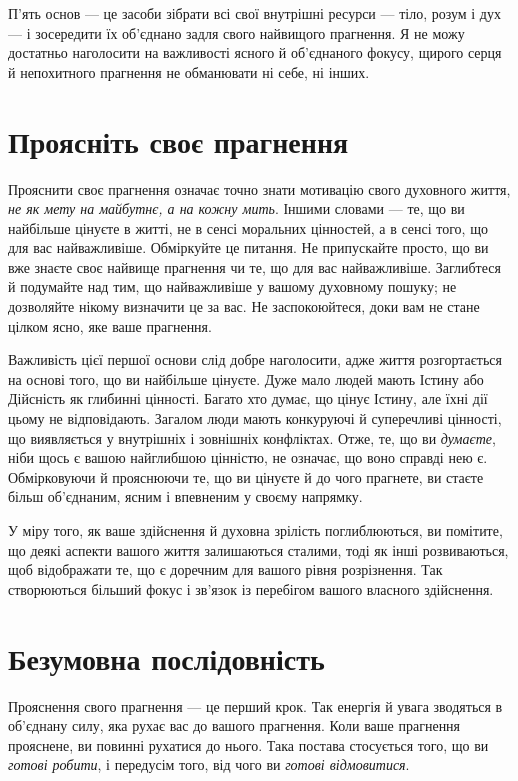 П'ять основ — це засоби зібрати всі свої внутрішні ресурси — тіло, розум і дух — і зосередити їх об'єднано задля свого найвищого прагнення. Я не можу достатньо наголосити на важливості ясного й об'єднаного фокусу, щирого серця й непохитного прагнення не обманювати ні себе, ні інших.

\section*{Проясніть своє прагнення}

Прояснити своє прагнення означає точно знати мотивацію свого духовного життя, \emph{не як мету на майбутнє, а на кожну мить}. Іншими словами — те, що ви найбільше цінуєте в житті, не в сенсі моральних цінностей, а в сенсі того, що для вас найважливіше. Обміркуйте це питання. Не припускайте просто, що ви вже знаєте своє найвище прагнення чи те, що для вас найважливіше. Заглибтеся й подумайте над тим, що найважливіше у вашому духовному пошуку; не дозволяйте нікому визначити це за вас. Не заспокоюйтеся, доки вам не стане цілком ясно, яке ваше прагнення.

Важливість цієї першої основи слід добре наголосити, адже життя розгортається на основі того, що ви найбільше цінуєте. Дуже мало людей мають Істину або Дійсність як глибинні цінності. Багато хто думає, що цінує Істину, але їхні дії цьому не відповідають. Загалом люди мають конкуруючі й суперечливі цінності, що виявляється у внутрішніх і зовнішніх конфліктах. Отже, те, що ви \emph{думаєте}, ніби щось є вашою найглибшою цінністю, не означає, що воно справді нею є. Обмірковуючи й прояснюючи те, що ви цінуєте й до чого прагнете, ви стаєте більш об'єднаним, ясним і впевненим у своєму напрямку.

У міру того, як ваше здійснення й духовна зрілість поглиблюються, ви помітите, що деякі аспекти вашого життя залишаються сталими, тоді як інші розвиваються, щоб відображати те, що є доречним для вашого рівня розрізнення. Так створюються більший фокус і зв'язок із перебігом вашого власного здійснення.

\section*{Безумовна послідовність}

Прояснення свого прагнення — це перший крок. Так енергія й увага зводяться в об'єднану силу, яка рухає вас до вашого прагнення. Коли ваше прагнення прояснене, ви повинні рухатися до нього. Така постава стосується того, що ви \emph{готові робити}, і передусім того, від чого ви \emph{готові відмовитися}.

